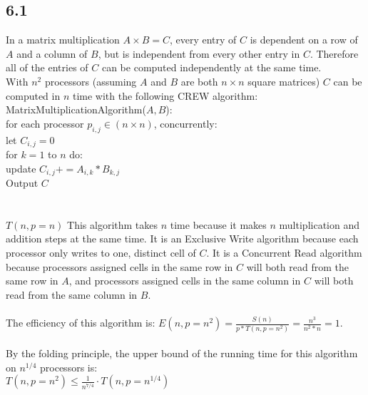 \documentclass[letterpaper,notitlepage,twoside]{article}
\newcommand\tab[1][1cm]{\hspace*{#1}} %
\begin{document}
\subsection*{6.1}
In a matrix multiplication $A \times B = C$, every entry of $C$ is dependent on a row of $A$ and a column of $B$, but is independent from every other entry in $C$. Therefore all of the entries of $C$ can be computed independently at the same time.\\
With $n^2$ processors (assuming $A$ and $B$ are both $n \times n$ square matrices) $C$ can be computed in $n$ time with the following CREW algorithm:\\
MatrixMultiplicationAlgorithm($A, B$):\\
\tab for each processor $p_{i, j} \in (n \times n)$, concurrently:\\
\tab\tab let $C_{i, j} = 0$\\
\tab\tab for $k = 1$ to $n$ do: \\
\tab\tab\tab update $C_{i, j} += A_{i, k} * B_{k, j}$\\
\tab Output $C$\\
\\\\
$T(n, p=n)$ This algorithm takes $n$ time because it makes $n$ multiplication and addition steps at the same time. It is an Exclusive Write algorithm because each processor only writes to one, distinct cell of $C$. It is a Concurrent Read algorithm because processors assigned cells in the same row in $C$ will both read from the same row in $A$, and processors assigned cells in the same column in $C$ will both read from the same column in $B$.
\\\\
The efficiency of this algorithm is: $E(n, p = n^2) = \frac{S(n)}{p * T(n, p = n^2)} = \frac{n^3}{n^2 * n} = 1$.
\\\\
By the folding principle, the upper bound of the running time for this algorithm on $n^{1/4}$ processors is:\\ 
$T(n, p = n^2) \leq \frac{1}{n^{7/4}} \cdot T(n, p = n^{1/4})$
\end{document}
